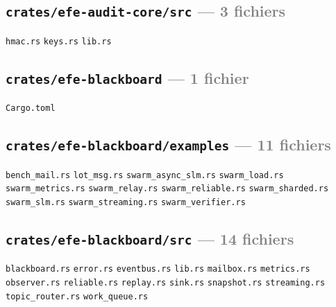 \documentclass[10pt]{report}
\newcommand{\code}[1]{\texttt{\small #1}}
\begin{document}
\subsection*{\code{crates/efe-audit-core/src} \normalfont\textcolor{grey}{--- 3 fichiers}}
\begin{sloppypar}\footnotesize\raggedright
\code{hmac.rs} \;\textbullet\; \code{keys.rs} \;\textbullet\; \code{lib.rs}
\end{sloppypar}

\subsection*{\code{crates/efe-blackboard} \normalfont\textcolor{grey}{--- 1 fichier}}
\begin{sloppypar}\footnotesize\raggedright
\code{Cargo.toml}
\end{sloppypar}

\subsection*{\code{crates/efe-blackboard/examples} \normalfont\textcolor{grey}{--- 11 fichiers}}
\begin{sloppypar}\footnotesize\raggedright
\code{bench\_mail.rs} \;\textbullet\; \code{lot\_msg.rs} \;\textbullet\; \code{swarm\_async\_slm.rs} \;\textbullet\; \code{swarm\_load.rs} \;\textbullet\; \code{swarm\_metrics.rs} \;\textbullet\; \code{swarm\_relay.rs} \;\textbullet\; \code{swarm\_reliable.rs} \;\textbullet\; \code{swarm\_sharded.rs} \;\textbullet\; \code{swarm\_slm.rs} \;\textbullet\; \code{swarm\_streaming.rs} \;\textbullet\; \code{swarm\_verifier.rs}
\end{sloppypar}

\subsection*{\code{crates/efe-blackboard/src} \normalfont\textcolor{grey}{--- 14 fichiers}}
\begin{sloppypar}\footnotesize\raggedright
\code{blackboard.rs} \;\textbullet\; \code{error.rs} \;\textbullet\; \code{eventbus.rs} \;\textbullet\; \code{lib.rs} \;\textbullet\; \code{mailbox.rs} \;\textbullet\; \code{metrics.rs} \;\textbullet\; \code{observer.rs} \;\textbullet\; \code{reliable.rs} \;\textbullet\; \code{replay.rs} \;\textbullet\; \code{sink.rs} \;\textbullet\; \code{snapshot.rs} \;\textbullet\; \code{streaming.rs} \;\textbullet\; \code{topic\_router.rs} \;\textbullet\; \code{work\_queue.rs}
\end{sloppypar}
\end{document}

